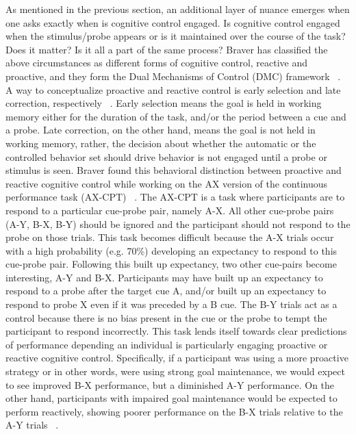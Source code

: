 \documentclass[phd,appendix,figures]{uithesis}
\begin{document}
As mentioned in the previous section, an additional layer of nuance emerges when one asks exactly when is cognitive control engaged.
Is cognitive control engaged when the stimulus/probe appears or is it maintained over the course of the task?
Does it matter?
Is it all a part of the same process?
Braver has classified the above circumstances as different forms of cognitive control, reactive and proactive, and they form the Dual Mechanisms of Control (DMC) framework ~\citep{Braver2012}.
A way to conceptualize proactive and reactive control is early selection and late correction, respectively ~\citep{Jacoby1999}.
Early selection means the goal is held in working memory either for the duration of the task, and/or the period between a cue and a probe.
Late correction, on the other hand, means the goal is not held in working memory, rather, the decision about whether the automatic or the controlled behavior set should drive behavior is not engaged until a probe or stimulus is seen.
Braver found this behavioral distinction between proactive and reactive cognitive control while working on the AX version of the continuous performance task (AX-CPT) ~\citep{Paxton2008}.
The AX-CPT is a task where participants are to respond to a particular cue-probe pair, namely A-X.
All other cue-probe pairs (A-Y, B-X, B-Y) should be ignored and the participant should not respond to the probe on those trials.
This task becomes difficult because the A-X trials occur with a high probability (e.g. 70\%) developing an expectancy to respond to this cue-probe pair.
Following this built up expectancy, two other cue-pairs become interesting, A-Y and B-X.
Participants may have built up an expectancy to respond to a probe after the target cue A, and/or built up an expectancy to respond to probe X even if it was preceded by a B cue.
The B-Y trials act as a control because there is no bias present in the cue or the probe to tempt the participant to respond incorrectly.
This task lends itself towards clear predictions of performance depending an individual is particularly engaging proactive or reactive cognitive control.
Specifically, if a participant was using a more proactive strategy or in other words, were using strong goal maintenance, we would expect to see improved B-X performance, but a diminished A-Y performance.
On the other hand, participants with impaired goal maintenance would be expected to perform reactively, showing poorer performance on the B-X trials relative to the A-Y trials ~\citep{Paxton2008}.
\end{document}
